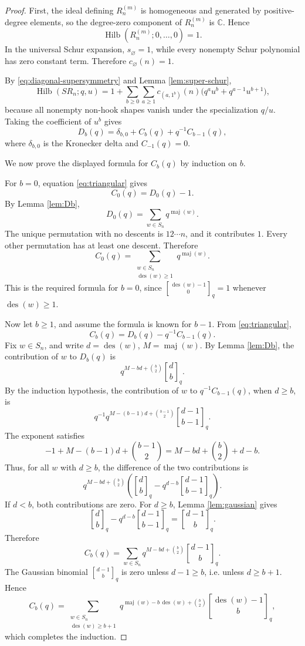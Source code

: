 \documentclass[12pt]{article}
\DeclareMathOperator{\Hilb}{Hilb}
\DeclareMathOperator{\des}{des}
\DeclareMathOperator{\maj}{maj}
\newcommand{\qbinom}[2]{\genfrac{[}{]}{0pt}{}{#1}{#2}_q}
\begin{document}
\begin{proof}
First, the ideal defining \(R_n^{(m)}\) is homogeneous and generated by positive-degree elements, so the degree-zero component of \(R_n^{(m)}\) is \(\mathbb C\).  Hence
\[
\Hilb(R_n^{(m)};0,\ldots,0)=1.
\]
In the universal Schur expansion, \(s_{\varnothing}=1\), while every nonempty Schur polynomial has zero constant term.  Therefore \(c_{\varnothing}(n)=1\).

By \eqref{eq:diagonal-supersymmetry} and Lemma \ref{lem:super-schur},
\[
\Hilb(SR_n;q,u)
=
1+
\sum_{b\ge 0}\sum_{a\ge 1}
c_{(a,1^b)}(n)\bigl(q^a u^b+q^{a-1}u^{b+1}\bigr),
\]
because all nonempty non-hook shapes vanish under the specialization \(q/u\).  Taking the coefficient of \(u^b\) gives
\begin{equation}\label{eq:triangular}
D_b(q)
=
\delta_{b,0}+C_b(q)+q^{-1}C_{b-1}(q),
\end{equation}
where \(\delta_{b,0}\) is the Kronecker delta and \(C_{-1}(q)=0\).

We now prove the displayed formula for \(C_b(q)\) by induction on \(b\).

For \(b=0\), equation \eqref{eq:triangular} gives
\[
C_0(q)=D_0(q)-1.
\]
By Lemma \ref{lem:Db},
\[
D_0(q)=\sum_{w\in S_n}q^{\maj(w)}.
\]
The unique permutation with no descents is \(12\cdots n\), and it contributes \(1\).  Every other permutation has at least one descent.  Therefore
\[
C_0(q)
=
\sum_{\substack{w\in S_n\\ \des(w)\ge 1}}q^{\maj(w)}.
\]
This is the required formula for \(b=0\), since \(\qbinom{\des(w)-1}{0}=1\) whenever \(\des(w)\ge 1\).

Now let \(b\ge 1\), and assume the formula is known for \(b-1\).  From \eqref{eq:triangular},
\[
C_b(q)=D_b(q)-q^{-1}C_{b-1}(q).
\]
Fix \(w\in S_n\), and write \(d=\des(w)\), \(M=\maj(w)\).  By Lemma \ref{lem:Db}, the contribution of \(w\) to \(D_b(q)\) is
\[
q^{M-bd+\binom{b}{2}}\qbinom{d}{b}.
\]
By the induction hypothesis, the contribution of \(w\) to \(q^{-1}C_{b-1}(q)\), when \(d\ge b\), is
\[
q^{-1}
q^{M-(b-1)d+\binom{b-1}{2}}
\qbinom{d-1}{b-1}.
\]
The exponent satisfies
\[
-1+M-(b-1)d+\binom{b-1}{2}
=
M-bd+\binom{b}{2}+d-b.
\]
Thus, for all \(w\) with \(d\ge b\), the difference of the two contributions is
\[
q^{M-bd+\binom{b}{2}}
\left(
\qbinom{d}{b}
-
q^{d-b}\qbinom{d-1}{b-1}
\right).
\]
If \(d<b\), both contributions are zero.  For \(d\ge b\), Lemma \ref{lem:gaussian} gives
\[
\qbinom{d}{b}
-
q^{d-b}\qbinom{d-1}{b-1}
=
\qbinom{d-1}{b}.
\]
Therefore
\[
C_b(q)
=
\sum_{w\in S_n}
q^{M-bd+\binom{b}{2}}
\qbinom{d-1}{b}.
\]
The Gaussian binomial \(\qbinom{d-1}{b}\) is zero unless \(d-1\ge b\), i.e. unless \(d\ge b+1\).  Hence
\[
C_b(q)
=
\sum_{\substack{w\in S_n\\ \des(w)\ge b+1}}
q^{\maj(w)-b\,\des(w)+\binom{b}{2}}
\qbinom{\des(w)-1}{b},
\]
which completes the induction.
\end{proof}
\end{document}
